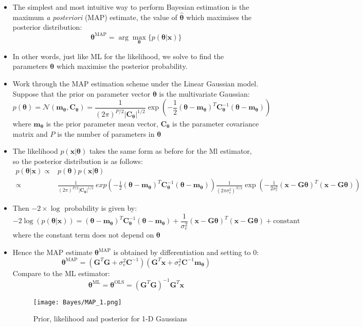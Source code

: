 \documentclass[12pt]{article}
\newcommand{\sigd}{\sigma^2}
\newcommand{\gau}{\mathcal{N}}
\newcommand{\OLS}{\textrm{OLS}}
\newcommand{\thetab}{\boldsymbol{\theta}}
\newcommand{\thetaols}{\thetab^\OLS}
\newcommand{\prethe}{\hat{\thetab}}
\newcommand{\xb}{\mathbf{x}}
\newcommand{\ml}{\textrm{ML}}
\newcommand{\Gb}{\mathbf{G}}
\newcommand{\map}{\textrm{MAP}}
\newcommand{\thetamap}{\thetab^\map}
\newcommand{\mb}{\mathbf{m}}
\newcommand{\cb}{\mathbf{C}}
\newcommand{\mbt}{\mb_{\thetab}}
\newcommand{\cbt}{\cb_{\thetab}}
\begin{document}
\begin{itemize}
    \item  The simplest and most intuitive way to perform Bayesian estimation is the maximum \textit{a posteriori} (MAP) estimate, the value of $\prethe$ which maximises the posterior distribution: 
    \[
    \thetamap = \arg\max_{\thetab} \{ p(\thetab | \xb)\}
    \]
    \item In other words, just like ML for the likelihood, we solve to find the parameters $\thetab$ which maximise the posterior probability.
    \item Work through the MAP estimation scheme under the Linear Gaussian model. Suppose that the prior on parameter vector $\thetab$ is the multivariate Gaussian:
    \[
    p(\thetab) = \gau (\mbt, \cbt) = \frac{1}{(2\pi)^{P/2}|\cbt|^{1/2}}\exp\left( -\frac{1}{2}(\thetab - \mbt)^T \cbt^{-1} (\thetab - \mbt)\right)
    \]
    where $\mbt$ is the prior parameter mean vector, $\cbt$ is the parameter covariance matrix and $P$ is the number of parameters in $\thetab$
    \item The likelihood $p(\xb | \thetab)$ takes the same form as before for the Ml estimator, so the posterior distribution is as follows:
    \begin{align*}
    p(\thetab | \xb) \propto & p(\thetab) p(\xb | \thetab)     \\
    \propto & \frac{1}{(2\pi)^{P/2}|\cbt|^{1/2}}\ exp \left( -\frac{1}{2}(\thetab - \mbt)^T \cbt^{-1} (\thetab - \mbt) \right)    \frac{1}{(2\pi\sigd_e)^{N/2}} \exp\left( -\frac{1}{2\sigd_e}(\xb - \Gb\thetab)^T (\xb - \Gb\thetab)\right)
    \end{align*}
    \item Then $-2 \times \log$ probability is given by:
    \[
    -2\log (p(\thetab | \xb)) = (\thetab - \mbt)^T \cbt^{-1} (\thetab - \mbt) + \frac{1}{\sigd_e}(\xb - \Gb \thetab)^T (\xb - \Gb \thetab) + \textrm{constant}
    \]
    where the constant term does not depend on $\thetab$
    \item Hence the MAP estimate $\thetamap$ is obtained by differentiation and setting to 0:
    \[
    \thetamap = (\Gb^T\Gb + \sigd_e\cb^{-1})(\Gb^T\xb + \sigd_e\cb^{-1}\mbt)
    \]
    Compare to the ML estimator:
    \[
    \thetab^{\ml} = \thetaols = (\Gb^T \Gb)^{-1} \Gb^T \xb
    \]
    \begin{figure}[H]
        \centering
        \texttt{[image: Bayes/MAP\_1.png]}
        \caption{Prior, likelihood and posterior for 1-D Gaussians}
    \end{figure}

\end{itemize}
\end{document}
